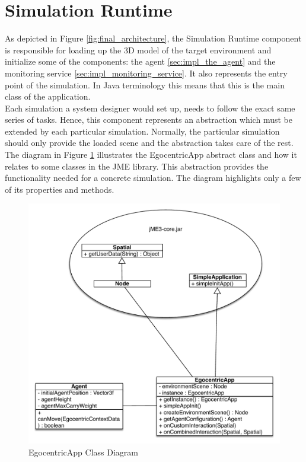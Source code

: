 \section{Simulation Runtime} %
\label{sec:impl_simulation_runtime}
As depicted in Figure \ref{fig:final_architecture}, the Simulation Runtime component is responsible for loading up the 3D model of the target environment and initialize some of the components: the agent \ref{sec:impl_the_agent} and the monitoring service \ref{sec:impl_monitoring_service}. It also represents the entry point of the simulation. In Java terminology this means that this is the main class of the application.\\

Each simulation a system designer would set up, needs to follow the exact same series of tasks. Hence, this component represents an abstraction which must be extended by each particular simulation. Normally, the particular simulation should only provide the loaded scene and the abstraction takes care of the rest.\\

The diagram in Figure \ref{fig:impl_ego_app} illustrates the EgocentricApp abstract class and how it relates to some classes in the JME library. This abstraction provides the functionality needed for a concrete simulation. The diagram highlights only a few of its properties and methods.
\begin{figure}[H]
	\centering
	\includegraphics[width=\linewidth]{gfx/Chapter4/ego_app}
	\caption{EgocentricApp Class Diagram}
	\label{fig:impl_ego_app}
\end{figure}

